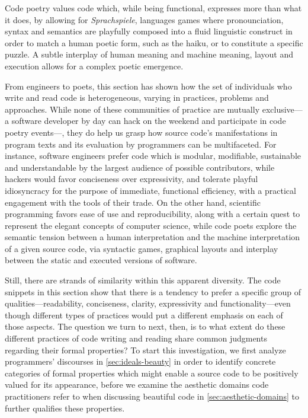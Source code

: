 Code poetry values code which, while being functional, expresses more than what it does, by allowing for \emph{Sprachspiele}, languages games where pronounciation, syntax and semantics are playfully composed into a fluid linguistic construct in order to match a human poetic form, such as the haiku, or to constitute a specific puzzle. A subtle interplay of human meaning and machine meaning, layout and execution allows for a complex poetic emergence.

\spacersmall

From engineers to poets, this section has shown how the set of individuals who write and read code is heterogeneous, varying in practices, problems and approaches. While none of these communities of practice are mutually exclusive—a software developer by day can hack on the weekend and participate in code poetry events—, they do help us grasp how source code's manifestations in program texts and its evaluation by programmers can be multifaceted. For instance, software engineers prefer code which is modular, modifiable, sustainable and understandable by the largest audience of possible contributors, while hackers would favor conciseness over expressivity, and tolerate playful idiosyncracy for the purpose of immediate, functional efficiency, with a practical engagement with the tools of their trade. On the other hand, scientific programming favors ease of use and reproducibility, along with a certain quest to represent the elegant concepts of computer science, while code poets explore the semantic tension between a human interpretation and the machine interpretation of a given source code, via syntactic games, graphical layouts and interplay between the static and executed versions of software.

Still, there are strands of similarity within this apparent diversity. The code snippets in this section show that there is a tendency to prefer a specific group of qualities—readability, conciseness, clarity, expressivity and functionality—even though different types of practices would put a different emphasis on each of those aspects. The question we turn to next, then, is to what extent do these different practices of code writing and reading share common judgments regarding their formal properties?  To start this investigation, we first analyze programmers' discourses in \autoref{sec:ideals-beauty} in order to identify concrete categories of formal properties which might enable a source code to be positively valued for its appearance, before we examine the aesthetic domains code practitioners refer to when discussing beautiful code in \autoref{sec:aesthetic-domains} to further qualifies these properties.

